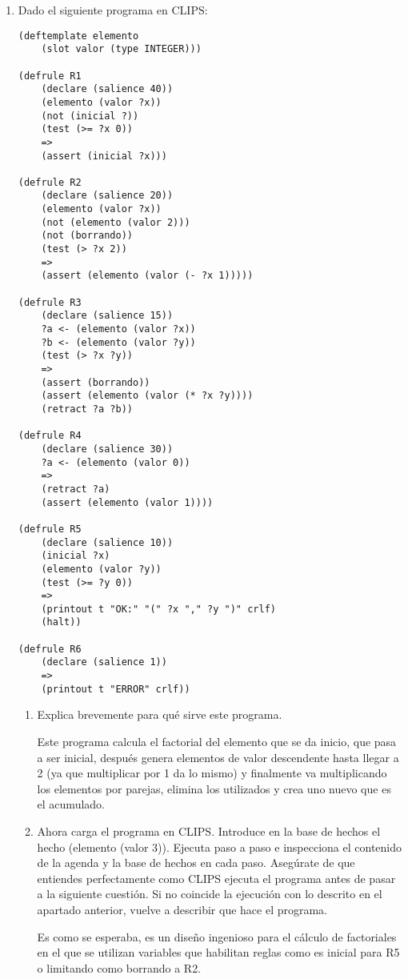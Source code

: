 \documentclass[12pt, spanish, pdftex]{UC3M_document}
\begin{document}
\begin{enumerate}
	\item  Dado el siguiente programa en CLIPS:
	      \begin{lstlisting}
(deftemplate elemento
    (slot valor (type INTEGER)))

(defrule R1
    (declare (salience 40))
    (elemento (valor ?x))
    (not (inicial ?))
    (test (>= ?x 0))
    =>
    (assert (inicial ?x)))

(defrule R2
    (declare (salience 20))
    (elemento (valor ?x))
    (not (elemento (valor 2)))
    (not (borrando))
    (test (> ?x 2))
    =>
    (assert (elemento (valor (- ?x 1)))))

(defrule R3
    (declare (salience 15))
    ?a <- (elemento (valor ?x))
    ?b <- (elemento (valor ?y))
    (test (> ?x ?y))
    =>
    (assert (borrando))
    (assert (elemento (valor (* ?x ?y))))
    (retract ?a ?b))

(defrule R4
    (declare (salience 30))
    ?a <- (elemento (valor 0))
    =>
    (retract ?a)
    (assert (elemento (valor 1))))

(defrule R5
    (declare (salience 10))
    (inicial ?x)
    (elemento (valor ?y))
    (test (>= ?y 0))
    =>
    (printout t "OK:" "(" ?x "," ?y ")" crlf)
    (halt))

(defrule R6
    (declare (salience 1))
    =>
    (printout t "ERROR" crlf))
\end{lstlisting}
	      \pagebreak

	      \begin{enumerate}
		      \item Explica brevemente para qué sirve este programa.

		            Este programa calcula el factorial del elemento que se da inicio, que pasa a ser inicial, después genera elementos de valor descendente hasta llegar a 2 (ya que multiplicar por 1 da lo mismo) y finalmente va multiplicando los elementos por parejas, elimina los utilizados y crea uno nuevo que es el acumulado.

		      \item Ahora carga el programa en CLIPS. Introduce en la base de hechos el hecho (elemento (valor 3)). Ejecuta paso a paso e inspecciona el contenido de la agenda y la base de hechos en cada paso. Asegúrate de que entiendes perfectamente como CLIPS ejecuta el programa antes de pasar a la siguiente cuestión. Si no coincide la ejecución con lo descrito en el apartado anterior, vuelve a describir que hace el programa.

		            Es como se esperaba, es un diseño ingenioso para el cálculo de factoriales en el que se utilizan variables que habilitan reglas como es inicial para R5 o limitando como borrando a R2.


\end{enumerate}
\end{enumerate}
\end{document}
